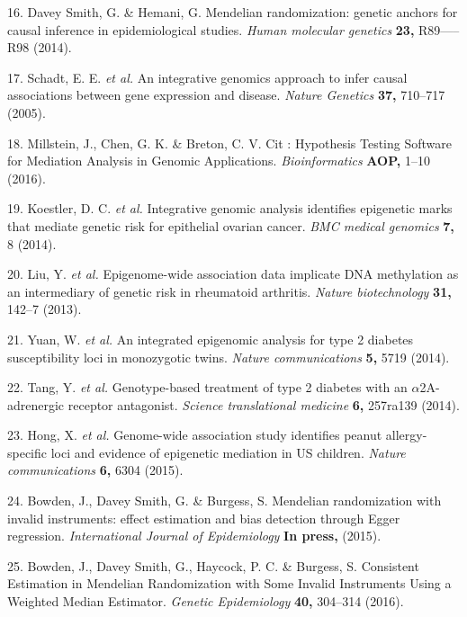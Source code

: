 \documentclass[]{article}
\begin{document}
\hypertarget{ref-DaveySmithHemani2014}{}
16. Davey Smith, G. \& Hemani, G. Mendelian randomization: genetic
anchors for causal inference in epidemiological studies. \emph{Human
molecular genetics} \textbf{23,} R89-----R98 (2014).

\hypertarget{ref-Schadt2005}{}
17. Schadt, E. E. \emph{et al.} An integrative genomics approach to
infer causal associations between gene expression and disease.
\emph{Nature Genetics} \textbf{37,} 710--717 (2005).

\hypertarget{ref-Millstein2016}{}
18. Millstein, J., Chen, G. K. \& Breton, C. V. Cit : Hypothesis Testing
Software for Mediation Analysis in Genomic Applications.
\emph{Bioinformatics} \textbf{AOP,} 1--10 (2016).

\hypertarget{ref-Koestler2014}{}
19. Koestler, D. C. \emph{et al.} Integrative genomic analysis
identifies epigenetic marks that mediate genetic risk for epithelial
ovarian cancer. \emph{BMC medical genomics} \textbf{7,} 8 (2014).

\hypertarget{ref-Liu2013}{}
20. Liu, Y. \emph{et al.} Epigenome-wide association data implicate DNA
methylation as an intermediary of genetic risk in rheumatoid arthritis.
\emph{Nature biotechnology} \textbf{31,} 142--7 (2013).

\hypertarget{ref-Yuan2014}{}
21. Yuan, W. \emph{et al.} An integrated epigenomic analysis for type 2
diabetes susceptibility loci in monozygotic twins. \emph{Nature
communications} \textbf{5,} 5719 (2014).

\hypertarget{ref-Tang2014}{}
22. Tang, Y. \emph{et al.} Genotype-based treatment of type 2 diabetes
with an \(\alpha\)2A-adrenergic receptor antagonist. \emph{Science
translational medicine} \textbf{6,} 257ra139 (2014).

\hypertarget{ref-Hong2015}{}
23. Hong, X. \emph{et al.} Genome-wide association study identifies
peanut allergy-specific loci and evidence of epigenetic mediation in US
children. \emph{Nature communications} \textbf{6,} 6304 (2015).

\hypertarget{ref-Bowden2015}{}
24. Bowden, J., Davey Smith, G. \& Burgess, S. Mendelian randomization
with invalid instruments: effect estimation and bias detection through
Egger regression. \emph{International Journal of Epidemiology}
\textbf{In press,} (2015).

\hypertarget{ref-Bowden2016b}{}
25. Bowden, J., Davey Smith, G., Haycock, P. C. \& Burgess, S.
Consistent Estimation in Mendelian Randomization with Some Invalid
Instruments Using a Weighted Median Estimator. \emph{Genetic
Epidemiology} \textbf{40,} 304--314 (2016).
\end{document}
